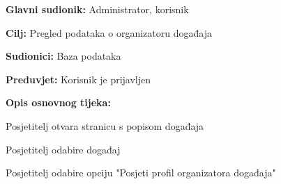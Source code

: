 					\noindent {}
					\begin{packed_item}
	
						\item \textbf{Glavni sudionik:} Administrator, korisnik
						\item  \textbf{Cilj:} Pregled podataka o organizatoru događaja
						\item  \textbf{Sudionici:} Baza podataka
						\item  \textbf{Preduvjet:} Korisnik je prijavljen
						\item  \textbf{Opis osnovnog tijeka:}
						
						\item[] \begin{packed_enum}
	
							\item Posjetitelj otvara stranicu s popisom događaja
							\item Posjetitelj odabire događaj
							\item Posjetitelj odabire opciju "Posjeti profil organizatora događaja"

						\end{packed_enum}

					\end{packed_item}

